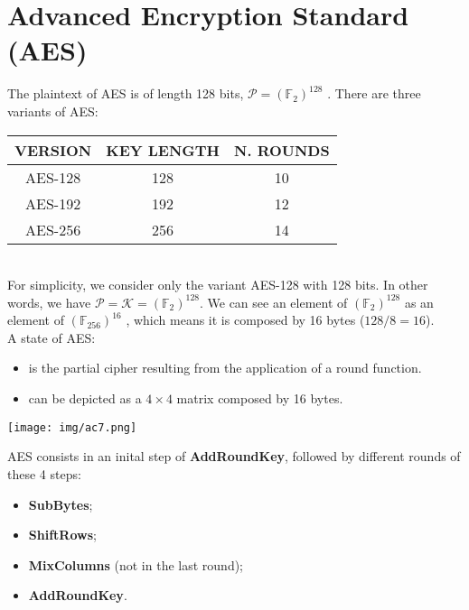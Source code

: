 \documentclass[a4paper, 10pt, titlepage]{article}
\begin{document}
\section{Advanced Encryption Standard (AES)}
The plaintext of AES is of length 128 bits, $\mathcal{P}= (\mathbb{F}_ 2)^{128}$ . There are three variants of AES: \medskip \\
\begin{tabular}{|c|c|c|}
\hline
VERSION & KEY LENGTH & N. ROUNDS \\
\hline AES-128 & 128 & 10 \\
AES-192 & 192 & 12 \\
AES-256 & 256 & 14 \\ \hline
\end{tabular} \medskip \\
For simplicity, we consider only the variant AES-128 with 128 bits.
In other words, we have $\mathcal{P} = \mathcal{K} = (\mathbb{F}_2) ^{128}$.
We can see an element of $(\mathbb{F}_2)^{128}$ as an element of $(\mathbb{F}_{256} )^{16}$ , which means it is composed by 16 bytes ($128/8=16$). \\
A state of AES:
\begin{itemize}
\item is the partial cipher resulting from the application of a round function.
\item can be depicted as a $4 \times 4$ matrix composed by 16 bytes.
\end{itemize}
\begin{center}
\texttt{[image: img/ac7.png]}
\end{center}
AES consists in an inital step of \textbf{AddRoundKey}, followed by different rounds of these 4 steps:
\begin{itemize}
\item \textbf{SubBytes};
\item \textbf{ShiftRows};
\item \textbf{MixColumns} (not in the last round);
\item \textbf{AddRoundKey}.
\end{itemize}

\end{document}
